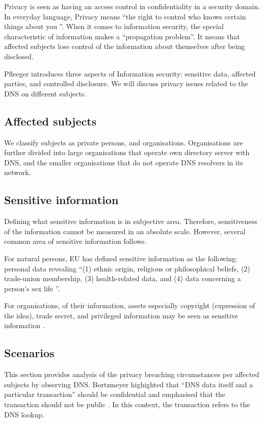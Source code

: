 Privacy is seen as having an access control in confidentiality in a security domain.
In everyday language, Privacy means ``the right to control who knows certain things about you \cite{securityincomputing}''.
When it comes to information security, the special characteristic of information makes a ``propagation problem''.
It means that affected subjects lose control of the information about themselves after being disclosed.

Pfleeger introduces three aspects of Information security: sensitive data, affected parties, and controlled disclosure.
We will discuss privacy issues related to the DNS on different subjects.

\subsection{Affected subjects}
We classify subjects as private persons, and organisations. Organisations are further divided into large organisations that operate own directory server with DNS, and the smaller organisations that do not operate DNS resolvers in its network.

\subsection{Sensitive information}
Defining what sensitive information is in subjective area.
Therefore, sensitiveness of the information cannot be measured in an absolute scale. However, several common area of sensitive information follows.

For natural persons, EU has defined sensitive information as the following: personal data revealing ``(1) ethnic origin, religious or philosophical beliefs, (2) trade-union membership, (3) health-related data, and (4) data concerning a person's sex life \cite{GDPR}''.

For organisations, of their information, assets especially copyright (expression of the idea), trade secret, and privileged information may be seen as sensitive information \cite{securityincomputing}.

\subsection{Scenarios}
This section provides analysis of the privacy breaching circumstances per affected subjects by observing DNS.
Bortzmeyer highighted that ``DNS data itself and a particular transaction'' should be confidential and emphasised that the transaction should not be public \cite{rfc7626}. In this context, the transaction refers to the DNS lookup.

